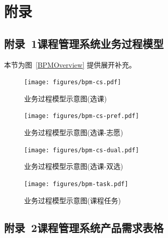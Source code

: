 \chapter*{附\qquad 录}

\setcounter{figure}{0}
\renewcommand{\thefigure}{A-\arabic{figure}}

\setcounter{table}{0}
\renewcommand{\thetable}{A-\arabic{table}}

\section*{附录~1\quad	课程管理系统业务过程模型}
\label{sec:appendix-bpm}

本节为图~\ref{BPMOverview} 提供展开补充。

\begin{figure}[!hbp]
  \begin{center}
    \texttt{[image: figures/bpm-cs.pdf]}
    \caption{业务过程模型示意图(选课)\label{BPMCourseRegister}}
  \end{center}
\end{figure}

\begin{figure}[!hbp]
  \begin{center}
    \texttt{[image: figures/bpm-cs-pref.pdf]}
    \caption{业务过程模型示意图(选课-志愿)\label{BPMCourseRegisterP}}
  \end{center}
\end{figure}

\begin{figure}[!hbp]
  \begin{center}
    \texttt{[image: figures/bpm-cs-dual.pdf]}
    \caption{业务过程模型示意图(选课-双选)\label{BPMCourseRegisterD}}
  \end{center}
\end{figure}

\begin{figure}[!hbp]
  \begin{center}
    \texttt{[image: figures/bpm-task.pdf]}
    \caption{业务过程模型示意图(课程任务)\label{BPMTask}}
  \end{center}
\end{figure}

\newpage

\section*{附录~2\quad	课程管理系统产品需求表格}
\label{sec:appendix-requirement-table}

